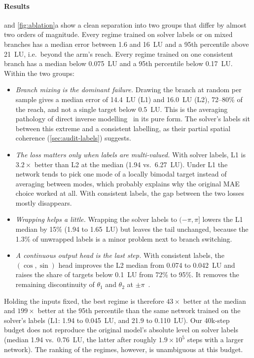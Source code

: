 \documentclass[conference]{IEEEtran}
\begin{document}
\paragraph{Results}
 and \cref{fig:ablation}a show a clean separation into two groups that differ by almost two orders of magnitude. Every regime trained on solver labels or on mixed branches has a median error between 1.6 and 16~LU and a 95th percentile above 21~LU, i.e.\ beyond the arm's reach. Every regime trained on one consistent branch has a median below 0.075~LU and a 95th percentile below 0.17~LU. Within the two groups:
\begin{itemize}
\item \emph{Branch mixing is the dominant failure.} Drawing the branch at random per sample gives a median error of 14.4~LU (L1) and 16.0~LU (L2), 72--80\% of the reach, and not a single target below 0.5~LU. This is the averaging pathology of direct inverse modelling~\cite{jordan1992forward} in its pure form. The solver's labels sit between this extreme and a consistent labelling, as their partial spatial coherence (\cref{sec:audit-labels}) suggests.
\item \emph{The loss matters only when labels are multi-valued.} With solver labels, L1 is $3.2\times$ better than L2 at the median (1.94 vs.\ 6.27~LU). Under L1 the network tends to pick one mode of a locally bimodal target instead of averaging between modes, which probably explains why the original MAE choice worked at all. With consistent labels, the gap between the two losses mostly disappears.
\item \emph{Wrapping helps a little.} Wrapping the solver labels to $(-\pi,\pi]$ lowers the L1 median by 15\% (1.94 to 1.65~LU) but leaves the tail unchanged, because the 1.3\% of unwrapped labels is a minor problem next to branch switching.
\item \emph{A continuous output head is the last step.} With consistent labels, the $(\cos,\sin)$ head improves the L2 median from 0.074 to 0.042~LU and raises the share of targets below 0.1~LU from 72\% to 95\%. It removes the remaining discontinuity of $\theta_1$ and $\theta_2$ at $\pm\pi$~\cite{zhou2019continuity}.
\end{itemize}
Holding the inputs fixed, the best regime is therefore $43\times$ better at the median and $199\times$ better at the 95th percentile than the same network trained on the solver's labels (L1: 1.94 to 0.045~LU, and 21.9 to 0.110~LU). Our 40k-step budget does not reproduce the original model's absolute level on solver labels (median 1.94 vs.\ 0.76~LU, the latter after roughly $1.9\times10^5$ steps with a larger network). The ranking of the regimes, however, is unambiguous at this budget.
\end{document}
